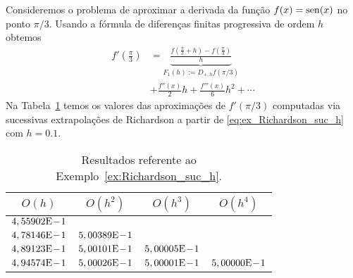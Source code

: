 \begin{ex}\label{ex:Richardson_suc_h}
  Consideremos o problema de aproximar a derivada da função $f(x) = \operatorname{sen}(x)$ no ponto $\pi/3$. Usando a fórmula de diferenças finitas progressiva de ordem $h$ obtemos
  \begin{align}
    f'\left(\frac{\pi}{3}\right) &= \underbrace{\frac{f\left(\frac{\pi}{3}+h\right)-f\left(\frac{\pi}{3}\right)}{h}}_{F_1(h) := D_{+,h}f(\pi/3)} \nonumber\\
          &+ \frac{f''(x)}{2}h + \frac{f'''(x)}{6}h^2 + \cdots \label{eq:ex_Richardson_suc_h}
  \end{align}
Na Tabela~\ref{tab:ex_Richardson_suc_h} temos os valores das aproximações de $f'(\pi/3)$ computadas via sucessivas extrapolações de Richardson a partir de \eqref{eq:ex_Richardson_suc_h} com $h=0.1$.

\begin{table}[h!]
  \centering
  \caption{Resultados referente ao Exemplo~\ref{ex:Richardson_suc_h}.}
  \begin{tabular}{cccc}\hline
    $O(h)$ & $O(h^2)$ & $O(h^3)$ & $O(h^4)$\\ \hline
    $4,55902\mathrm{E}\!-\!1$ \\
    $4,78146\mathrm{E}\!-\!1$ & $5,00389\mathrm{E}\!-\!1$ \\
    $4,89123\mathrm{E}\!-\!1$ & $5,00101\mathrm{E}\!-\!1$ & $5,00005\mathrm{E}\!-\!1$ \\
    $4,94574\mathrm{E}\!-\!1$ & $5,00026\mathrm{E}\!-\!1$ & $5,00001\mathrm{E}\!-\!1$ & $5,00000\mathrm{E}\!-\!1$ \\\hline
  \end{tabular}
  \label{tab:ex_Richardson_suc_h}
\end{table}



\end{ex}

